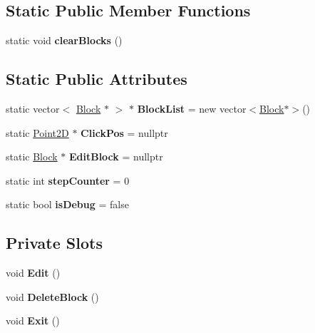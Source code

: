 \subsection*{Static Public Member Functions}
\begin{DoxyCompactItemize}
\item 
\mbox{\label{classWidget_aa07cb14c8c863c9f18083be1971d7a5f}} 
static void {\bfseries clear\+Blocks} ()
\end{DoxyCompactItemize}
\subsection*{Static Public Attributes}
\begin{DoxyCompactItemize}
\item 
\mbox{\label{classWidget_abe90e3d11863b73206f0ad77131bb25f}} 
static vector$<$ \hyperlink{classBlock}{Block} $\ast$ $>$ $\ast$ {\bfseries Block\+List} = new vector$<$\hyperlink{classBlock}{Block}$\ast$$>$()
\item 
\mbox{\label{classWidget_a81c8f66ab759bc85296cd79f0657f7f4}} 
static \hyperlink{classPoint2D}{Point2D} $\ast$ {\bfseries Click\+Pos} = nullptr
\item 
\mbox{\label{classWidget_addece0cbdceb758e88758b87e4a2dbcc}} 
static \hyperlink{classBlock}{Block} $\ast$ {\bfseries Edit\+Block} = nullptr
\item 
\mbox{\label{classWidget_ab7658893bc5ac6aaa0c98dd44f42da28}} 
static int {\bfseries step\+Counter} = 0
\item 
\mbox{\label{classWidget_a5c333f100a5d090ec878558fc4e9c9f8}} 
static bool {\bfseries is\+Debug} = false
\end{DoxyCompactItemize}
\subsection*{Private Slots}
\begin{DoxyCompactItemize}
\item 
\mbox{\label{classWidget_a2e486690913bcc4df153102f30e9bbf8}} 
void {\bfseries Edit} ()
\item 
\mbox{\label{classWidget_a7bfb6be2621893a32cf5a9779387d7c4}} 
void {\bfseries Delete\+Block} ()
\item 
\mbox{\label{classWidget_aed117e0c294b2945bbcdd350721e025f}} 
void {\bfseries Exit} ()
\end{DoxyCompactItemize}

